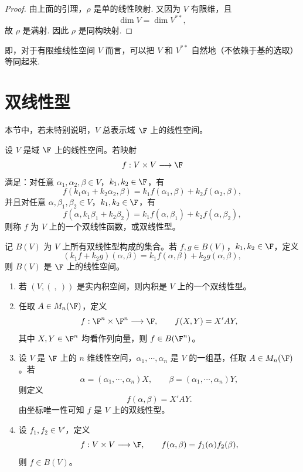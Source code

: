 \begin{proof}
	由上面的引理，$\rho$ 是单的线性映射. 又因为 $V$ 有限维，且
	\[
	\dim V=\dim V^{**},
	\]
	故 $\rho$ 是满射. 因此 $\rho$ 是同构映射.
\end{proof}

即，对于有限维线性空间 $V$ 而言，可以把 $V$ 和 $V^{**}$ 自然地（不依赖于基的选取）等同起来.


\section{双线性型}

本节中，若未特别说明，$V$ 总表示域 $\F$ 上的线性空间。

\begin{definition}[双线性型]\label{p1:concept:c7-l335}
	设 $V$ 是域 $\F$ 上的线性空间。若映射
	\[
	f:V\times V\longrightarrow \F
	\]
	满足：对任意 $\alpha_1,\alpha_2,\beta\in V$，$k_1,k_2\in\F$，有
	\[
	f(k_1\alpha_1+k_2\alpha_2,\beta)
	=k_1f(\alpha_1,\beta)+k_2f(\alpha_2,\beta),
	\]
	并且对任意 $\alpha,\beta_1,\beta_2\in V$，$k_1,k_2\in\F$，有
	\[
	f(\alpha,k_1\beta_1+k_2\beta_2)
	=k_1f(\alpha,\beta_1)+k_2f(\alpha,\beta_2),
	\]
	则称 $f$ 为 $V$ 上的一个双线性函数，或双线性型。
	
	记 $B(V)$ 为 $V$ 上所有双线性型构成的集合。若 $f,g\in B(V)$，$k_1,k_2\in\F$，定义
	\[
	(k_1f+k_2g)(\alpha,\beta)=k_1f(\alpha,\beta)+k_2g(\alpha,\beta),
	\]
	则 $B(V)$ 是 $\F$ 上的线性空间。
\end{definition}



\begin{example}
	\begin{enumerate}
		\item 若 $(V,(\ ,\ ))$ 是实内积空间，则内积是 $V$ 上的一个双线性型。
		\item 任取 $A\in M_n(\F)$，定义
		\[
		f:\F^n\times\F^n\longrightarrow\F,
		\qquad
		f(X,Y)=X'AY,
		\]
		其中 $X,Y\in\F^n$ 均看作列向量，则 $f\in B(\F^n)$。
		\item 设 $V$ 是 $\F$ 上的 $n$ 维线性空间，$\alpha_1,\cdots,\alpha_n$ 是 $V$ 的一组基，任取 $A\in M_n(\F)$。若
		\[
		\alpha=(\alpha_1,\cdots,\alpha_n)X,
		\qquad
		\beta=(\alpha_1,\cdots,\alpha_n)Y,
		\]
		则定义
		\[
		f(\alpha,\beta)=X'AY .
		\]
		由坐标唯一性可知 $f$ 是 $V$ 上的双线性型。
		\item 设 $f_1,f_2\in V'$，定义
		\[
		f:V\times V\longrightarrow\F,
		\qquad
		f(\alpha,\beta)=f_1(\alpha)f_2(\beta),
		\]
		则 $f\in B(V)$。
	\end{enumerate}
\end{example}

